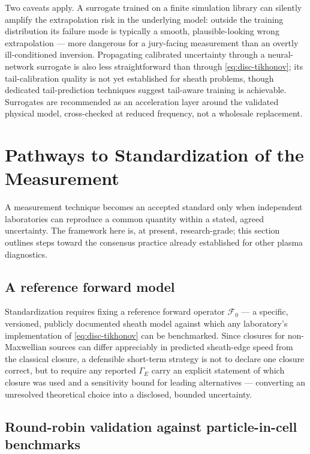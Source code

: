Two caveats apply. A surrogate trained on a finite simulation library can silently amplify the extrapolation risk in the underlying model: outside the training distribution its failure mode is typically a smooth, plausible-looking wrong extrapolation — more dangerous for a jury-facing measurement than an overtly ill-conditioned inversion. Propagating calibrated uncertainty through a neural-network surrogate is also less straightforward than through \cref{eq:disc-tikhonov}; its tail-calibration quality is not yet established for sheath problems, though dedicated tail-prediction techniques \cite{ref0096} suggest tail-aware training is achievable. Surrogates are recommended as an acceleration layer around the validated physical model, cross-checked at reduced frequency, not a wholesale replacement.

\section{Pathways to Standardization of the Measurement}
\label{sec:disc-standard}

A measurement technique becomes an accepted standard only when independent laboratories can reproduce a common quantity within a stated, agreed uncertainty. The framework here is, at present, research-grade; this section outlines steps toward the consensus practice already established for other plasma diagnostics.

\subsection{A reference forward model}

Standardization requires fixing a reference forward operator $\mathcal{F}_{0}$ — a specific, versioned, publicly documented sheath model against which any laboratory's implementation of \cref{eq:disc-tikhonov} can be benchmarked. Since closures for non-Maxwellian sources \cite{ref0090} can differ appreciably in predicted sheath-edge speed from the classical closure, a defensible short-term strategy is not to declare one closure correct, but to require any reported $\Gamma_{E}$ carry an explicit statement of which closure was used and a sensitivity bound for leading alternatives — converting an unresolved theoretical choice into a disclosed, bounded uncertainty.

\subsection{Round-robin validation against particle-in-cell benchmarks}

